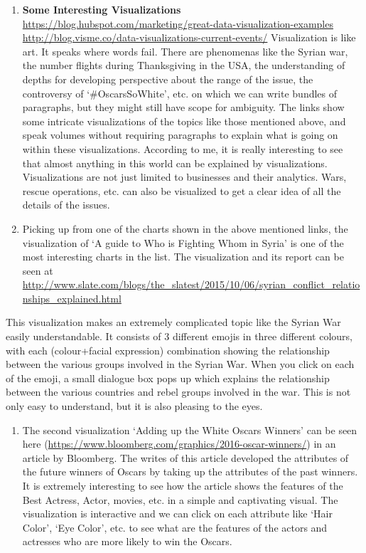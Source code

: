 \documentclass[]{book}
\providecommand{\tightlist}{%
  \setlength{\itemsep}{0pt}\setlength{\parskip}{0pt}}
\theoremstyle{definition}
\theoremstyle{definition}
\theoremstyle{definition}
\theoremstyle{remark}
\begin{document}
\begin{enumerate}
\def\labelenumi{\arabic{enumi}.}
\setcounter{enumi}{9}
\item
  \textbf{Some Interesting Visualizations}
  \url{https://blog.hubspot.com/marketing/great-data-visualization-examples}
  \url{http://blog.visme.co/data-visualizations-current-events/}
  Visualization is like art. It speaks where words fail. There are
  phenomenas like the Syrian war, the number flights during Thanksgiving
  in the USA, the understanding of depths for developing perspective
  about the range of the issue, the controversy of `\#OscarsSoWhite',
  etc. on which we can write bundles of paragraphs, but they might still
  have scope for ambiguity. The links show some intricate visualizations
  of the topics like those mentioned above, and speak volumes without
  requiring paragraphs to explain what is going on within these
  visualizations. According to me, it is really interesting to see that
  almost anything in this world can be explained by visualizations.
  Visualizations are not just limited to businesses and their analytics.
  Wars, rescue operations, etc. can also be visualized to get a clear
  idea of all the details of the issues.
\item
  Picking up from one of the charts shown in the above mentioned links,
  the visualization of `A guide to Who is Fighting Whom in Syria' is one
  of the most interesting charts in the list. The visualization and its
  report can be seen at
  \url{http://www.slate.com/blogs/the_slatest/2015/10/06/syrian_conflict_relationships_explained.html}
\end{enumerate}

This visualization makes an extremely complicated topic like the Syrian
War easily understandable. It consists of 3 different emojis in three
different colours, with each (colour+facial expression) combination
showing the relationship between the various groups involved in the
Syrian War. When you click on each of the emoji, a small dialogue box
pops up which explains the relationship between the various countries
and rebel groups involved in the war. This is not only easy to
understand, but it is also pleasing to the eyes.

\begin{enumerate}
\def\labelenumi{\arabic{enumi}.}
\setcounter{enumi}{1}
\tightlist
\item
  The second visualization `Adding up the White Oscars Winners' can be
  seen here
  (\url{https://www.bloomberg.com/graphics/2016-oscar-winners/}) in an
  article by Bloomberg. The writes of this article developed the
  attributes of the future winners of Oscars by taking up the attributes
  of the past winners. It is extremely interesting to see how the
  article shows the features of the Best Actress, Actor, movies, etc. in
  a simple and captivating visual. The visualization is interactive and
  we can click on each attribute like `Hair Color', `Eye Color', etc. to
  see what are the features of the actors and actresses who are more
  likely to win the Oscars.
\end{enumerate}
\end{document}
